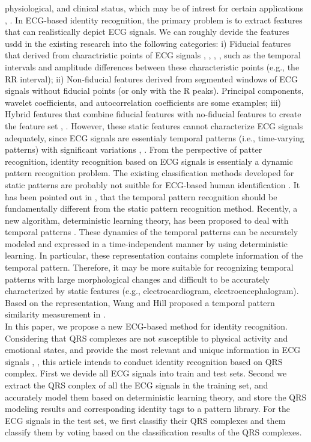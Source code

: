 \documentclass[onecolumn,12pt]{article}
\begin{document}
physiological, and clinical status, which may be of intrest for certain applications \cite{citation18}, \cite{citation21}. In ECG-based identity recognition, the primary problem is to extract features that can realistically depict ECG signals. We can roughly devide the features usdd in the existing research into the following categories: i) Fiducial features that derived from charactristic points of ECG signals \cite{citation15}, \cite{citation16}, \cite{citation19}, \cite{citation21}, such as the temporal intervals and amplitude differences between these characteristic points (e.g., the RR interval); ii) Non-fiducial features derived from segmented windows of ECG signals \cite{citation22, citation23, citation24} without fiducial points (or only with the R peaks). Principal components, wavelet coefficients, and autocorrelation coefficients are some examples; iii) Hybrid features that combine fiducial features with no-fiducial features to create the feature set \cite{citation3}, \cite{citation25}. However, these static features cannot characterize ECG signals adequately, since ECG signals are essentialy temporal patterns (i.e., time-varying patterns) with significant variations \cite{citation26}, \cite{citation27}. From the perspective of patter recognition, identity recognition based on ECG signals is essentialy a dynamic pattern recognition problem. The existing classification methods developed for static patterns are probably not suitble for ECG-based human identification \cite{citation27}. It has been pointed out in \cite{citation28}, \cite{citation29} that the temporal pattern recognition should be fundamentally different from the static pattern recognition method. Recently, a new algorithm, deterministic learning theory, has been proposed to deal with temporal patterns \cite{citation29, citation30, citation31}. These dynamics of the temporal patterns can be accurately modeled and expressed in a time-independent manner by using deterministic learning. In particular, these representation contains complete information of the temporal pattern. Therefore, it may be more suitable for recognizing temporal patterns with large morphological changes and difficult to be accurately characterized by static features (e.g., electrocardiogram, electroencephalogram). Based on the representation, Wang and Hill proposed a temporal pattern similarity measurement in \cite{citation31}.\\In this paper, we propose a new ECG-based method for identity recognition. Considering that QRS complexes are not susceptible to physical activity and emotional states, and provide the most relevant and unique information in ECG signals \cite{citation10}, \cite{citation32}, this article intends to conduct identity recognition based on QRS complex. First we devide all ECG signals into train and test sets. Second we extract the QRS conplex of all the ECG signals in the training set, and accurately model them based on deterministic learning theory, and store the QRS modeling results and corresponding identity tags to a pattern library. For the ECG signals in the test set, we first classifiy their QRS complexes and them classify them by voting based on the classification results of the QRS complexes.
\end{document}
